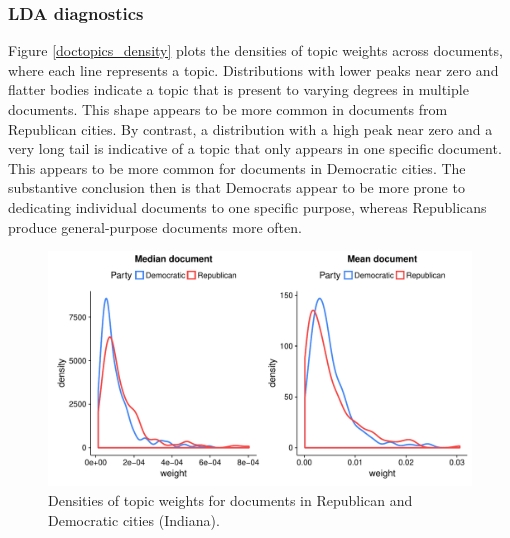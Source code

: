 \documentclass[11pt]{article}
\begin{document}
\subsubsection{LDA diagnostics}

Figure \ref{doctopics_density} plots the densities of topic weights across documents, where each line represents a topic. Distributions with lower peaks near zero and flatter bodies indicate a topic that is present to varying degrees in multiple documents. This shape appears to be more common in documents from Republican cities. By contrast, a distribution with a high peak near zero and a very long tail is indicative of a topic that only appears in one specific document. This appears to be more common for documents in Democratic cities. The substantive conclusion then is that Democrats appear to be more prone to dedicating individual documents to one specific purpose, whereas Republicans produce general-purpose documents more often.

\begin{figure}[!ht]
	\centering %
	\caption{Densities of topic weights for documents in Republican and Democratic cities (Indiana).}
	\label{topicweights_density}
	\includegraphics[width=\linewidth]{figures/topicweights_density_IN.pdf}
\end{figure}
\end{document}
